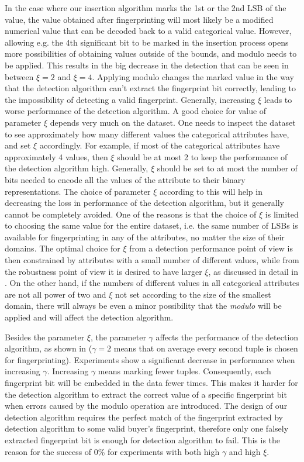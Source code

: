 In the case where our insertion algorithm marks the 1st or the 2nd LSB of the value, the value obtained after fingerprinting will most likely be a modified numerical value that can be decoded back to a valid categorical value.
However, allowing e.g. the 4th significant bit to be marked in the insertion process opens more possibilities of obtaining values outside of the bounds, and modulo needs to be applied.
This results in the big decrease in the detection that can be seen in  between $\xi=2$ and $\xi=4$. 
Applying modulo changes the marked value in the way that the detection algorithm can't extract the fingerprint bit correctly, leading to the impossibility of detecting a valid fingerprint. 
Generally, increasing $\xi$ leads to worse performance of the detection algorithm. 
A good choice for value of parameter $\xi$ depends very much on the dataset. 
One needs to inspect the dataset to see approximately how many different values the categorical attributes have, and set $\xi$ accordingly.
For example, if most of the categorical attributes have approximately 4 values, then $\xi$ should be at most 2 to keep the performance of the detection algorithm high. 
Generally, $\xi$ should be set to at most the number of bits needed to encode all the values of the attribute to their binary representations. 
The choice of parameter $\xi$ according to this will help in decreasing the loss in performance of the detection algorithm, but it generally cannot be completely avoided.
One of the reasons is that the choice of $\xi$ is limited to choosing the same value for the entire dataset, i.e. the same number of LSBs is available for fingerprinting in any of the attributes, no matter the size of their domains.
The optimal choice for $\xi$ from a detection performance point of view is then constrained by attributes with a small number of different values, while from the robustness point of view it is desired to have larger $\xi$, as discussed in detail in . 
On the other hand, if the numbers of different values in all categorical attributes are not all power of two and $\xi$ not set according to the size of the smallest domain, there will always be even a minor possibility that the \textit{modulo} will be applied and will affect the detection algorithm. 

Besides the parameter $\xi$, the parameter $\gamma$ affects the performance of the detection algorithm, as shown in  ($\gamma=2$ means that on average every second tuple is chosen for fingerprinting). 
Experiments show a significant decrease in performance when increasing $\gamma$. 
Increasing $\gamma$ means marking fewer tuples. Consequently, each fingerprint bit will be embedded in the data fewer times. 
This makes it harder for the detection algorithm to extract the correct value of a specific fingerprint bit when errors caused by the modulo operation are introduced. 
The design of our detection algorithm requires the perfect match of the fingerprint extracted by detection algorithm to some valid buyer's fingerprint, therefore only one falsely extracted fingerprint bit is enough for detection algorithm to fail. 
This is the reason for the success of 0\% for experiments with both high $\gamma$ and high $\xi$.

